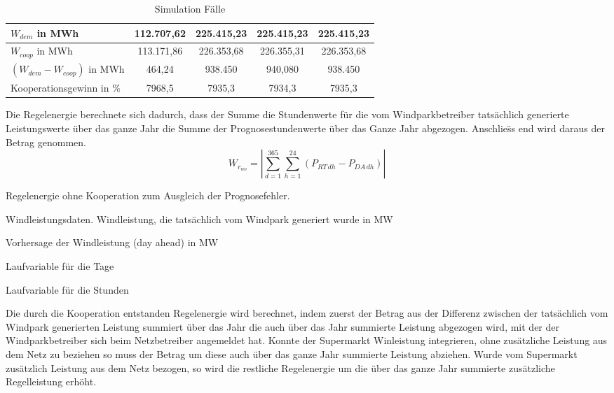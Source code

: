 \begin{table}
{\begin{tabularx}{\textwidth}{X|X|X|X|X|X|X|X|X|}
\hline
\hline
\multicolumn{1}{|l|}{$W_{dem}$ in MWh } & \multicolumn{2}{c|}{112.707,62} &
\multicolumn{2}{c|}{225.415,23} &
\multicolumn{2}{c|}{225.415,23} &
\multicolumn{2}{c|}{225.415,23}\\
\hline
\multicolumn{1}{|l|}{$W_{coop}$ in MWh} & \multicolumn{2}{c|}{113.171,86} &
\multicolumn{2}{c|}{226.353,68} &
\multicolumn{2}{c|}{226.355,31} &
\multicolumn{2}{c|}{226.353,68}\\
\hline
\multicolumn{1}{|l|}{$(W_{dem} - W_{coop})$ in MWh} & \multicolumn{2}{c|}{464,24} &
\multicolumn{2}{c|}{938.450} &
\multicolumn{2}{c|}{940,080} &
\multicolumn{2}{c|}{938.450}\\
\hline
\hline
\multicolumn{1}{|l|}{Kooperationsgewinn in \%} & \multicolumn{2}{c|}{7968,5} &
\multicolumn{2}{c|}{7935,3} &
\multicolumn{2}{c|}{7934,3} &
\multicolumn{2}{c|}{7935,3}\\
\hline
\end{tabularx}
}
\caption{Simulation F\"alle}
\label{t:faelle}
\end{table}

Die Regelenergie berechnete sich dadurch, dass der Summe die Stundenwerte f\"ur
die vom Windparkbetreiber tats\"achlich generierte Leistungswerte \"uber
das ganze Jahr die Summe der Prognosestundenwerte \"uber das Ganze Jahr
abgezogen. Anschlie\"ss end wird daraus der Betrag genommen.
\begin{equation}
	W_{r_{wo}} = |\sum^{365}_{d=1}\sum^{24}_{h=1}(P_{RT\,dh}-P_{DA\,dh})|
\label{eq:wrwo}
\end{equation}
\begin{description}[\dth]
\item[$W_{r_{wo}}$] Regelenergie ohne Kooperation zum Ausgleich der
Prognosefehler.
\item[$P_{RT}$] Windleistungsdaten. Windleistung, die tats\"achlich vom
Windpark generiert wurde in MW
\item[$P_{DA}$] Vorhersage der Windleistung (day ahead) in MW
\item[$d$] Laufvariable f\"ur die Tage
\item[$h$] Laufvariable f\"ur die Stunden
\end{description}

Die durch die Kooperation entstanden Regelenergie wird berechnet, indem zuerst
der Betrag aus der Differenz zwischen der tats\"achlich vom Windpark generierten
Leistung summiert \"uber das Jahr die auch \"uber das Jahr summierte Leistung
abgezogen wird, mit der der Windparkbetreiber sich beim Netzbetreiber angemeldet
hat. Konnte der Supermarkt Winleistung integrieren, ohne zus\"atzliche Leistung
aus dem Netz zu beziehen so muss der Betrag um diese auch \"uber das ganze Jahr
summierte Leistung abziehen. Wurde vom Supermarkt zus\"atzlich Leistung aus dem
Netz bezogen, so wird die restliche Regelenergie um die \"uber das ganze Jahr
summierte zus\"atzliche Regelleistung erh\"oht.

